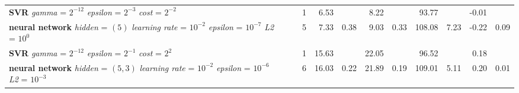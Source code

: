 \begin{table}[ht]
\begin{tabular}{lllrrrrrrrrr}
  \makecell[tl]{\textbf{SVR}\\ \textit{gamma} = $2^{-12}$ \\ \textit{epsilon} = $2^{-3}$ \\ \textit{cost} = $2^{-2}$} & \cellcolor[HTML]{FFFF88}{summer} & \cellcolor[HTML]{EADAFF}{seasonal} &   1 & 6.53 &  & 8.22 &  & 93.77 &  & -0.01 &  \\ 
  \makecell[tl]{\textbf{neural network}\\ \textit{hidden} = $(5)$ \\ \textit{learning rate} = $10^{-2}$ \\ \textit{epsilon} = $10^{-7}$ \\ \textit{L2} = $10^{0}$} & \cellcolor[HTML]{FFFF88}{summer} & \cellcolor[HTML]{EADAFF}{seasonal} &   5 & 7.33 & 0.38 & 9.03 & 0.33 & 108.08 & 7.23 & -0.22 & 0.09 \\ 
  \makecell[tl]{\textbf{SVR}\\ \textit{gamma} = $2^{-12}$ \\ \textit{epsilon} = $2^{-1}$ \\ \textit{cost} = $2^{2}$} & \cellcolor[HTML]{FFAA88}{autumn} & \cellcolor[HTML]{FFFFFF}{all} &   1 & 15.63 &  & 22.05 &  & 96.52 &  & 0.18 &  \\ 
  \makecell[tl]{\textbf{neural network}\\ \textit{hidden} = $(5, 3)$ \\ \textit{learning rate} = $10^{-2}$ \\ \textit{epsilon} = $10^{-6}$ \\ \textit{L2} = $10^{-3}$} & \cellcolor[HTML]{FFAA88}{autumn} & \cellcolor[HTML]{FFFFFF}{all} &   6 & 16.03 & 0.22 & 21.89 & 0.19 & 109.01 & 5.11 & 0.20 & 0.01 \\ 
   \bottomrule
\end{tabular}
\endgroup
\end{table}
